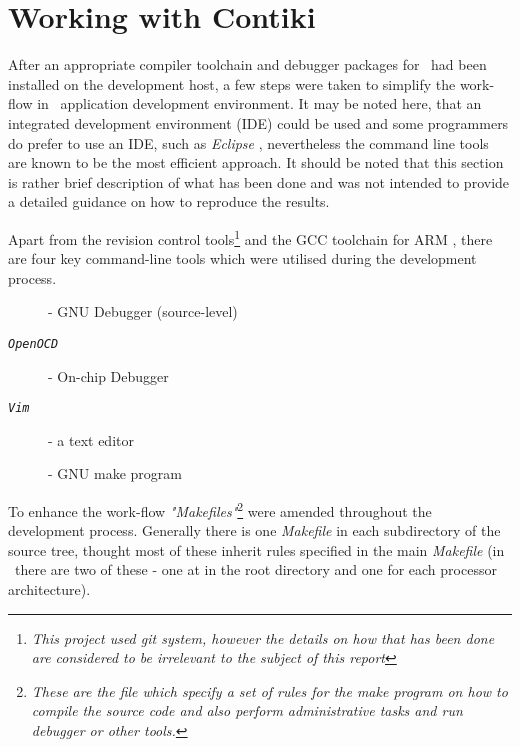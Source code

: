 \section{Working with Contiki}
  
  After an appropriate compiler toolchain and debugger packages for \MCX\
 had been installed on the development host, a few steps were taken to
 simplify the work-flow in \Contiki\ application development environment.
 It may be noted here, that an integrated development environment (IDE)
 could be used and some programmers do prefer to use an IDE, such as
 \emph{Eclipse} \cite{links:contiki:wiki:eclipse}, nevertheless the
 command line tools are known to be the most efficient approach.
 It should be noted that this section is rather brief description of what
 has been done and was not intended to provide a detailed guidance on how
 to reproduce the results.

  Apart from the revision control tools\footnote{\emph{This project used
 git system, however the details on how that has been done are considered
 to be irrelevant to the subject of this report}} and the GCC toolchain
 for ARM \cite{links:mc1322x:gcc}, there are four key command-line tools
 which were utilised during the development process.

\begin{description}
	\item [] - GNU Debugger (source-level) \cite{docs:gdb:manual}
	\item [\emph{\texttt{OpenOCD}}] - On-chip Debugger \cite{links:mc1322x:ocd}
	\item [\emph{\texttt{Vim}}] - a text editor
	\item [] - GNU make program \cite{docs:make:manual}
\end{description}





  To enhance the work-flow \emph{"Makefiles"}\footnote{\emph{These are
 the file which specify a set of rules for the make program on how to
 compile the source code and also perform administrative tasks and run
 debugger or other tools.}} were amended throughout the development
 process. Generally there is one \emph{Makefile} in each subdirectory
 of the source tree, thought most of these inherit rules specified in
 the main \emph{Makefile} (in \Contiki\ there are two of these - one
 at in the root directory and one for each processor architecture).

